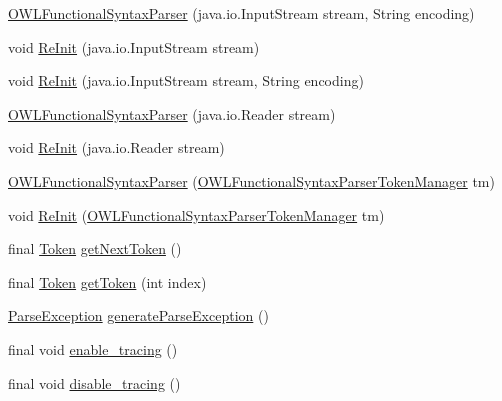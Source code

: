 \begin{DoxyCompactItemize}
\item 
\hyperlink{classorg_1_1coode_1_1owlapi_1_1functionalparser_1_1_o_w_l_functional_syntax_parser_ad186d5a8c54967898a68bd6236baad7f}{O\-W\-L\-Functional\-Syntax\-Parser} (java.\-io.\-Input\-Stream stream, String encoding)
\item 
void \hyperlink{classorg_1_1coode_1_1owlapi_1_1functionalparser_1_1_o_w_l_functional_syntax_parser_acae8b8c02f3adb52a4f786e22a934f5c}{Re\-Init} (java.\-io.\-Input\-Stream stream)
\item 
void \hyperlink{classorg_1_1coode_1_1owlapi_1_1functionalparser_1_1_o_w_l_functional_syntax_parser_af67228cd5dff518d3458cfd5b7152bf9}{Re\-Init} (java.\-io.\-Input\-Stream stream, String encoding)
\item 
\hyperlink{classorg_1_1coode_1_1owlapi_1_1functionalparser_1_1_o_w_l_functional_syntax_parser_a8f8a9fda8d8c90a82bec3ba92ac1d61c}{O\-W\-L\-Functional\-Syntax\-Parser} (java.\-io.\-Reader stream)
\item 
void \hyperlink{classorg_1_1coode_1_1owlapi_1_1functionalparser_1_1_o_w_l_functional_syntax_parser_a5bd96c12026e124e4038409cc82a9981}{Re\-Init} (java.\-io.\-Reader stream)
\item 
\hyperlink{classorg_1_1coode_1_1owlapi_1_1functionalparser_1_1_o_w_l_functional_syntax_parser_a94ce162345423ae6ab53629354453c82}{O\-W\-L\-Functional\-Syntax\-Parser} (\hyperlink{classorg_1_1coode_1_1owlapi_1_1functionalparser_1_1_o_w_l_functional_syntax_parser_token_manager}{O\-W\-L\-Functional\-Syntax\-Parser\-Token\-Manager} tm)
\item 
void \hyperlink{classorg_1_1coode_1_1owlapi_1_1functionalparser_1_1_o_w_l_functional_syntax_parser_ac46fbedd41f485686806dc8855989708}{Re\-Init} (\hyperlink{classorg_1_1coode_1_1owlapi_1_1functionalparser_1_1_o_w_l_functional_syntax_parser_token_manager}{O\-W\-L\-Functional\-Syntax\-Parser\-Token\-Manager} tm)
\item 
final \hyperlink{classorg_1_1coode_1_1owlapi_1_1functionalparser_1_1_token}{Token} \hyperlink{classorg_1_1coode_1_1owlapi_1_1functionalparser_1_1_o_w_l_functional_syntax_parser_a190a6795b3b9e4bbc0cd31a96a6be2dc}{get\-Next\-Token} ()
\item 
final \hyperlink{classorg_1_1coode_1_1owlapi_1_1functionalparser_1_1_token}{Token} \hyperlink{classorg_1_1coode_1_1owlapi_1_1functionalparser_1_1_o_w_l_functional_syntax_parser_a2d1e62002b72919076fa638182404e38}{get\-Token} (int index)
\item 
\hyperlink{classorg_1_1coode_1_1owlapi_1_1functionalparser_1_1_parse_exception}{Parse\-Exception} \hyperlink{classorg_1_1coode_1_1owlapi_1_1functionalparser_1_1_o_w_l_functional_syntax_parser_aacd9378b6f5254a379bd0994fccdfb3e}{generate\-Parse\-Exception} ()
\item 
final void \hyperlink{classorg_1_1coode_1_1owlapi_1_1functionalparser_1_1_o_w_l_functional_syntax_parser_a2370f0b58264462757b2d72cebf1560c}{enable\-\_\-tracing} ()
\item 
final void \hyperlink{classorg_1_1coode_1_1owlapi_1_1functionalparser_1_1_o_w_l_functional_syntax_parser_a90ddc73f7d24cd89419804522e2c08f9}{disable\-\_\-tracing} ()
\end{DoxyCompactItemize}
